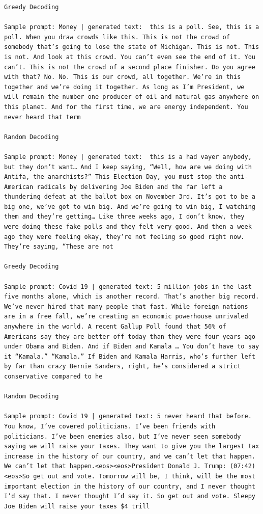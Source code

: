 \documentclass{article}
\begin{document}
\begin{lstlisting}
Greedy Decoding

Sample prompt: Money | generated text:  this is a poll. See, this is a poll. When you draw crowds like this. This is not the crowd of somebody that’s going to lose the state of Michigan. This is not. This is not. And look at this crowd. You can’t even see the end of it. You can’t. This is not the crowd of a second place finisher. Do you agree with that? No. No. This is our crowd, all together. We’re in this together and we’re doing it together. As long as I’m President, we will remain the number one producer of oil and natural gas anywhere on this planet. And for the first time, we are energy independent. You never heard that term 

Random Decoding

Sample prompt: Money | generated text:  this is a had vayer anybody, but they don’t want… And I keep saying, “Well, how are we doing with Antifa, the anarchists?” This Election Day, you must stop the anti-American radicals by delivering Joe Biden and the far left a thundering defeat at the ballot box on November 3rd. It’s got to be a big one, we’ve got to win big. And we’re going to win big, I watching them and they’re getting… Like three weeks ago, I don’t know, they were doing these fake polls and they felt very good. And then a week ago they were feeling okay, they’re not feeling so good right now. They’re saying, “These are not

Greedy Decoding

Sample prompt: Covid 19 | generated text: 5 million jobs in the last five months alone, which is another record. That’s another big record. We’ve never hired that many people that fast. While foreign nations are in a free fall, we’re creating an economic powerhouse unrivaled anywhere in the world. A recent Gallup Poll found that 56% of Americans say they are better off today than they were four years ago under Obama and Biden. And if Biden and Kamala … You don’t have to say it “Kamala.” “Kamala.” If Biden and Kamala Harris, who’s further left by far than crazy Bernie Sanders, right, he’s considered a strict conservative compared to he

Random Decoding

Sample prompt: Covid 19 | generated text: 5 never heard that before. You know, I’ve covered politicians. I’ve been friends with politicians. I’ve been enemies also, but I’ve never seen somebody saying we will raise your taxes. They want to give you the largest tax increase in the history of our country, and we can’t let that happen. We can’t let that happen.<eos><eos>President Donald J. Trump: (07:42)<eos>So get out and vote. Tomorrow will be, I think, will be the most important election in the history of our country, and I never thought I’d say that. I never thought I’d say it. So get out and vote. Sleepy Joe Biden will raise your taxes $4 trill


\end{lstlisting}
\end{document}
